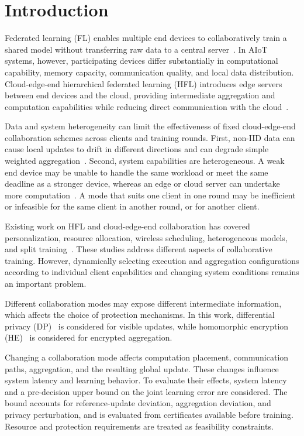 \documentclass[5p,times]{elsarticle}
\theoremstyle{plain}
\theoremstyle{definition}
\theoremstyle{remark}
\begin{document}
\section{Introduction}
\label{sec:introduction}
Federated learning (FL) enables multiple end devices to collaboratively train a shared model without transferring raw data to a central server~\cite{fedavg,ZHAO2026108518}. In AIoT systems, however, participating devices differ substantially in computational capability, memory capacity, communication quality, and local data distribution. Cloud-edge-end hierarchical federated learning (HFL) introduces edge servers between end devices and the cloud, providing intermediate aggregation and computation capabilities while reducing direct communication with the cloud~\cite{hfl,FLaTEC2026,yang2026hierarchical}.

Data and system heterogeneity can limit the effectiveness of fixed cloud-edge-end collaboration schemes across clients and training rounds. First, non-IID data can cause
local updates to drift in different directions and can degrade simple weighted
aggregation~\cite{fedavgm,fedprox,scaffold,khan2026accelerating,11214447}.
Second, system capabilities are heterogeneous. A weak end device may be unable
to handle the same workload or meet the same deadline as a stronger device,
whereas an edge or cloud server can undertake more computation~\cite{wang2019adaptivefl,FAN2026108249}.
A mode that suits one client in one round may be inefficient or infeasible
for the same client in another round, or for another client.

Existing work on HFL and cloud-edge-end collaboration has covered personalization,
resource allocation, wireless scheduling, heterogeneous models, and split
training~\cite{Personalizedhfl,JSJX202502007,dinh2021wirelessfl,BSBODP,mazloomi2025multiserver,SFETEC,11185336,YAO2026108495}.
These studies address different aspects of collaborative training. However, dynamically selecting execution and aggregation configurations according to individual client capabilities and changing system conditions remains an important problem.

Different collaboration modes may expose different intermediate information, which affects the choice of protection mechanisms. In this work, differential privacy (DP)~\cite{dwork2006calibrating,mironov2017rdp,11267456} is considered for visible updates, while homomorphic encryption (HE)~\cite{cheon2017ckks,11372457} is considered for encrypted aggregation.

Changing a collaboration mode affects computation placement, communication paths, aggregation, and the resulting global update. These changes influence system latency and learning behavior. To evaluate their effects, system latency and a pre-decision upper bound on the joint learning error are considered. The bound accounts for reference-update deviation, aggregation deviation, and privacy perturbation, and is evaluated from certificates available before training. Resource and protection requirements are treated as feasibility constraints.
\end{document}

